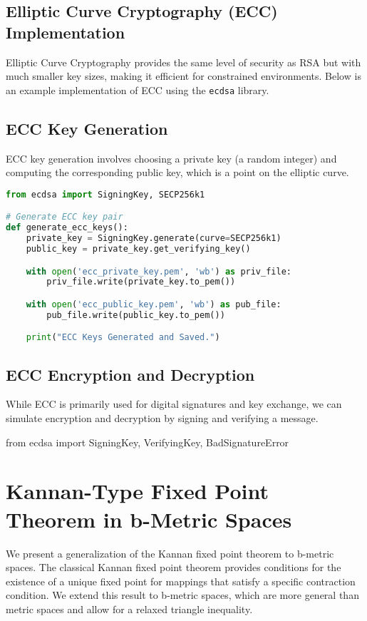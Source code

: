 \documentclass[12pt]{report}
\numberwithin{equation}{chapter}
\begin{document}
\subsection{Elliptic Curve Cryptography (ECC) Implementation}

Elliptic Curve Cryptography provides the same level of security as RSA but with much smaller key sizes, making it efficient for constrained environments. Below is an example implementation of ECC using the \texttt{ecdsa} library.

\subsection{ECC Key Generation}

ECC key generation involves choosing a private key (a random integer) and computing the corresponding public key, which is a point on the elliptic curve.

\begin{lstlisting}[language=Python]
from ecdsa import SigningKey, SECP256k1

# Generate ECC key pair
def generate_ecc_keys():
    private_key = SigningKey.generate(curve=SECP256k1)
    public_key = private_key.get_verifying_key()

    with open('ecc_private_key.pem', 'wb') as priv_file:
        priv_file.write(private_key.to_pem())

    with open('ecc_public_key.pem', 'wb') as pub_file:
        pub_file.write(public_key.to_pem())

    print("ECC Keys Generated and Saved.")
\end{lstlisting}

\subsection{ECC Encryption and Decryption}

While ECC is primarily used for digital signatures and key exchange, we can simulate encryption and decryption by signing and verifying a message.


from ecdsa import SigningKey, VerifyingKey, BadSignatureError

\section{Kannan-Type Fixed Point Theorem in b-Metric Spaces}
We present a generalization of the Kannan fixed point theorem to b-metric spaces. The classical Kannan fixed point theorem provides conditions for the existence of a unique fixed point for mappings that satisfy a specific contraction condition. We extend this result to b-metric spaces, which are more general than metric spaces and allow for a relaxed triangle inequality.
\end{document}

